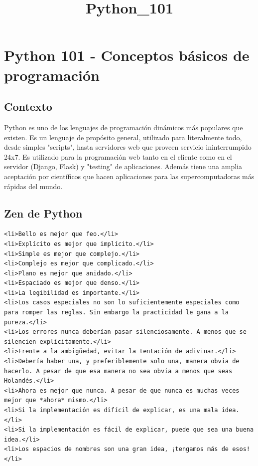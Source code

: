 \documentclass[11pt]{article}
\title{Python\_101}
\begin{document}
    
    
    \maketitle
    
    

    
    \section{Python 101 - Conceptos básicos de
programación}\label{python-101---conceptos-buxe1sicos-de-programaciuxf3n}

\subsection{Contexto}\label{contexto}

Python es uno de los lenguajes de programación dinámicos más populares
que existen. Es un lenguaje de propósito general, utilizado para
literalmente todo, desde simples "scripts", hasta servidores web que
proveen servicio ininterrumpido 24x7. Es utilizado para la programación
web tanto en el cliente como en el servidor (Django, Flask) y "testing"
de aplicaciones. Además tiene una amplia aceptación por científicos que
hacen aplicaciones para las supercomputadoras más rápidas del mundo.

\subsection{Zen de Python}\label{zen-de-python}

\begin{verbatim}
<li>Bello es mejor que feo.</li>
<li>Explícito es mejor que implícito.</li>
<li>Simple es mejor que complejo.</li>
<li>Complejo es mejor que complicado.</li>
<li>Plano es mejor que anidado.</li>
<li>Espaciado es mejor que denso.</li>
<li>La legibilidad es importante.</li>
<li>Los casos especiales no son lo suficientemente especiales como para romper las reglas. Sin embargo la practicidad le gana a la pureza.</li>
<li>Los errores nunca deberían pasar silenciosamente. A menos que se silencien explícitamente.</li>
<li>Frente a la ambigüedad, evitar la tentación de adivinar.</li>
<li>Debería haber una, y preferiblemente solo una, manera obvia de hacerlo. A pesar de que esa manera no sea obvia a menos que seas Holandés.</li>
<li>Ahora es mejor que nunca. A pesar de que nunca es muchas veces mejor que *ahora* mismo.</li>
<li>Si la implementación es difícil de explicar, es una mala idea.</li>
<li>Si la implementación es fácil de explicar, puede que sea una buena idea.</li>
<li>Los espacios de nombres son una gran idea, ¡tengamos más de esos!</li>
\end{verbatim}
\end{document}
